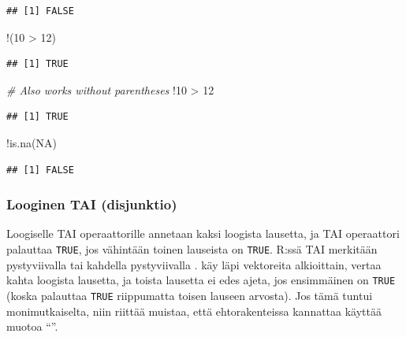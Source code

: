 \documentclass[
]{book}
\newenvironment{Shaded}{\begin{snugshade}}{\end{snugshade}}
\newcommand{\CommentTok}[1]{\textcolor[rgb]{0.56,0.35,0.01}{\textit{#1}}}
\newcommand{\ConstantTok}[1]{\textcolor[rgb]{0.00,0.00,0.00}{#1}}
\newcommand{\DecValTok}[1]{\textcolor[rgb]{0.00,0.00,0.81}{#1}}
\newcommand{\FunctionTok}[1]{\textcolor[rgb]{0.00,0.00,0.00}{#1}}
\newcommand{\NormalTok}[1]{#1}
\newcommand{\SpecialCharTok}[1]{\textcolor[rgb]{0.00,0.00,0.00}{#1}}
\begin{document}
\begin{verbatim}
## [1] FALSE
\end{verbatim}

\begin{Shaded}
\begin{Highlighting}[]
\SpecialCharTok{!}\NormalTok{(}\DecValTok{10} \SpecialCharTok{\textgreater{}} \DecValTok{12}\NormalTok{)}
\end{Highlighting}
\end{Shaded}

\begin{verbatim}
## [1] TRUE
\end{verbatim}

\begin{Shaded}
\begin{Highlighting}[]
\CommentTok{\# Also works without parentheses}
\SpecialCharTok{!}\DecValTok{10} \SpecialCharTok{\textgreater{}} \DecValTok{12}
\end{Highlighting}
\end{Shaded}

\begin{verbatim}
## [1] TRUE
\end{verbatim}

\begin{Shaded}
\begin{Highlighting}[]
\SpecialCharTok{!}\FunctionTok{is.na}\NormalTok{(}\ConstantTok{NA}\NormalTok{)}
\end{Highlighting}
\end{Shaded}

\begin{verbatim}
## [1] FALSE
\end{verbatim}

\hypertarget{looginen-tai-disjunktio}{%
\subsubsection{Looginen TAI (disjunktio)}\label{looginen-tai-disjunktio}}

Loogiselle TAI operaattorille annetaan kaksi loogista lausetta, ja TAI operaattori palauttaa \texttt{TRUE}, jos vähintään toinen lauseista on \texttt{TRUE}. R:ssä TAI merkitään pystyviivalla \texttt{\textbar{}} tai kahdella pystyviivalla \texttt{\textbar{}\textbar{}}. \texttt{\textbar{}} käy läpi vektoreita alkioittain, \texttt{\textbar{}\textbar{}} vertaa kahta loogista lausetta, ja toista lausetta ei edes ajeta, jos ensimmäinen on \texttt{TRUE} (koska \texttt{\textbar{}\textbar{}} palauttaa \texttt{TRUE} riippumatta toisen lauseen arvosta). Jos tämä tuntui monimutkaiselta, niin riittää muistaa, että ehtorakenteissa kannattaa käyttää muotoa ``\textbar\textbar{}''.
\end{document}
